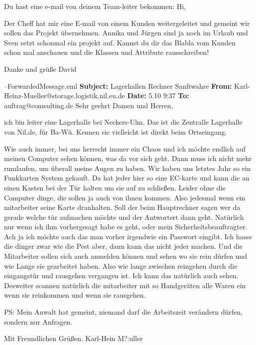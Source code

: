 Du hast eine e-mail von deinem Team-leiter bekommen:
Hi,

Der Cheff hat mir eine E-mail von einem Kunden weitergeleitet und gemeint wir sollen das Projekt übernehmen. Annika und Jürgen sind ja noch im Urlaub und Sven setzt schonmal ein projekt auf. Kannst du dir das Blabla vom Kunden schon mal anschauen und die Klassen und Attribute rausschreiben!

Danke und grüße
David

--ForwardedMessage.eml\hline
\textbf{Subject:} Lagerhallen Rechner Sanftwahre 
\textbf{From:} Karl-Heinz-Mueller@storage.logistik.nil.eu.de
\textbf{Date:} 5.10 9:37
\textbf{To:} auftrag@comsulting.de
Sehr geehrt Damen und Herren,

ich bin leiter eine Lagerhalle bei Neckers-Ulm. Das ist die Zentralle Lagerhalle von Nil.de, für Ba-Wü. Kennen sie vielleicht ist direkt beim Ortseingang.

Wie auch immer, bei uns herrscht immer ein Chaos und ich möchte endlich auf meinen Computer sehen können, was da vor sich geht. Dann muss ich nicht mehr rumlaufen, um überall meine Augen zu haben.
Wir haben uns letztes Jahr so ein Funkkarten System gekauft. Da hat jeder hier so eine EC-karte und kann die an einen Kasten bei der Tür halten um sie auf zu schließen. Leider ohne die Computer dinge, die sollen ja auch von ihnen kommen. Also jedesmal wenn ein mitarbeiter seine Karte dranhalten. Soll der beim Hauptrechner sagen wer da gerade welche tür aufmachen möchte und der Antwortert dann geht. Natürlich nur wenn ich ihm vorhergesagt habe es geht, oder mein Sicherheitsbeauftragter. Ach ja ich möchte auch das man vorher irgendwie ein Passwort eingibt. Ich hasse die dinger zwar wie die Pest aber, dann kann das nicht jeder machen. 
Und die Mitarbeiter sollen sich auch anmelden können und sehen wo sie rein dürfen und wie Lange sie gearbeitet haben. Also wie lange zwischen reingehen durch die eingangstür und rausgehen vergangen ist. Ich kann das natürlich auch sehen.\\
Desweiter scannen natürlich die mitarbeiter mit so Handgeräten alle Waren ein wenn sie reinkommen und wenn sie rausgehen.

PS: Mein Anwalt hat gemeint, niemand darf die Arbeitszeit verändern dürfen, sondern nur Anfragen.

Mit Freundlichen Grüßen.
Karl-Hein M?:uller
